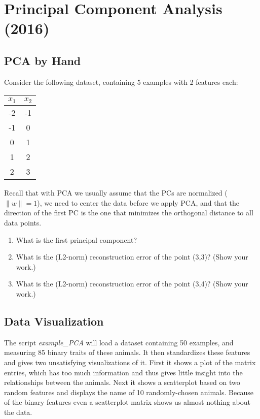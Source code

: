 \documentclass{article}
\def\blu#1{{\color{blu}#1}}
\def\norm#1{\|#1\|}
\def\enum#1{\begin{enumerate}#1\end{enumerate}}
\begin{document}
\section{Principal Component Analysis (2016)}

\subsection{PCA by Hand}

Consider the following dataset, containing 5 examples with 2 features each:
\begin{center}
\begin{tabular}{cc}
$x_1$ & $x_2$\\
\hline
-2 & -1\\
-1 & 0\\
0 & 1\\
1 & 2\\
2 & 3\\
\end{tabular}
\end{center}
Recall that with PCA we usually assume that the PCs are normalized ($\norm{w} = 1$), we need to center the data before we apply PCA, and that the direction of the first PC is the one that minimizes the orthogonal distance to all data points.
\blu{
\enum{
\item What is the first principal component?
\item What is the (L2-norm) reconstruction error of the point (3,3)? (Show your work.)
\item What is the (L2-norm) reconstruction error of the point (3,4)? (Show your work.)
}
}




\subsection{Data Visualization}

The script \emph{example\_PCA} will load a dataset containing 50 examples, and measuring 85 binary traits of these animals. It then standardizes these features and gives two unsatisfying visualizations of it. First it shows a plot of the matrix entries, which has too much information and thus gives little insight into the relationships between the animals. Next it shows a scatterplot based on two random features and displays the name of 10 randomly-chosen animals. Because of the binary features even a scatterplot matrix shows us almost nothing about the data.
\end{document}
